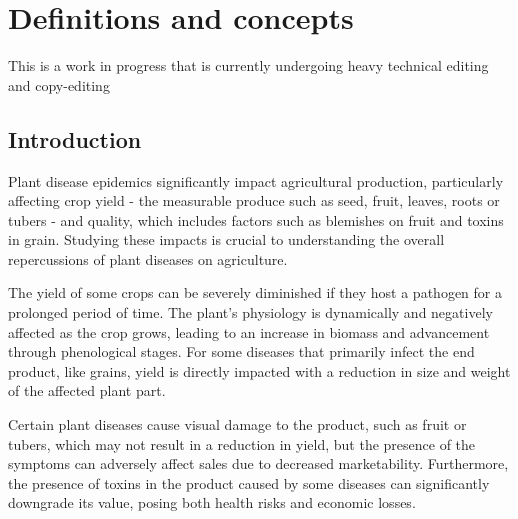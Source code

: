 \documentclass[
  letterpaper,
]{book}
\begin{document}
\hypertarget{definitions-and-concepts}{%
\chapter{Definitions and concepts}\label{definitions-and-concepts}}

\begin{tcolorbox}[enhanced jigsaw, bottomrule=.15mm, toprule=.15mm, breakable, arc=.35mm, rightrule=.15mm, leftrule=.75mm, colback=white, left=2mm, colframe=quarto-callout-note-color-frame, opacityback=0]
\begin{minipage}[t]{5.5mm}
\textcolor{quarto-callout-note-color}{\faInfo}
\end{minipage}%
\begin{minipage}[t]{\textwidth - 5.5mm}

This is a work in progress that is currently undergoing heavy technical
editing and copy-editing

\end{minipage}%
\end{tcolorbox}

\hypertarget{introduction-2}{%
\section{Introduction}\label{introduction-2}}

Plant disease epidemics significantly impact agricultural production,
particularly affecting crop yield - the measurable produce such as seed,
fruit, leaves, roots or tubers - and quality, which includes factors
such as blemishes on fruit and toxins in grain. Studying these impacts
is crucial to understanding the overall repercussions of plant diseases
on agriculture.

The yield of some crops can be severely diminished if they host a
pathogen for a prolonged period of time. The plant's physiology is
dynamically and negatively affected as the crop grows, leading to an
increase in biomass and advancement through phenological stages. For
some diseases that primarily infect the end product, like grains, yield
is directly impacted with a reduction in size and weight of the affected
plant part.

Certain plant diseases cause visual damage to the product, such as fruit
or tubers, which may not result in a reduction in yield, but the
presence of the symptoms can adversely affect sales due to decreased
marketability. Furthermore, the presence of toxins in the product caused
by some diseases can significantly downgrade its value, posing both
health risks and economic losses.
\end{document}

